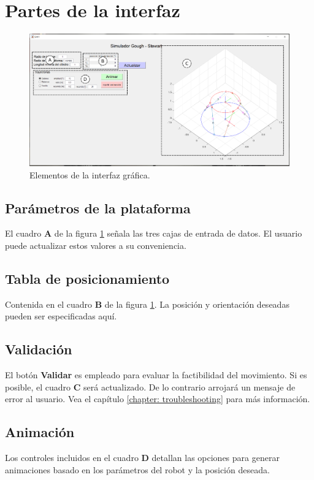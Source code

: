 \section{Partes de la interfaz}

\begin{figure}[ht]
 \centering
 \includegraphics[scale=0.3]{img/gui_labels.PNG}
 \caption{Elementos de la interfaz gráfica.}
 \label{fig: GUI explained}
\end{figure}

\subsection{Parámetros de la plataforma}
El cuadro \textbf{A} de la figura 
\ref{fig: GUI explained} señala las tres cajas de entrada
de datos. El usuario puede actualizar estos valores a su conveniencia.


\subsection{Tabla de posicionamiento}
Contenida en el cuadro \textbf{B} de la figura \ref{fig: GUI explained}.
La posición y orientación deseadas pueden ser especificadas aquí.


\subsection{Validación}
El botón \textbf{Validar} es empleado para evaluar la factibilidad del
movimiento. 
Si es posible, el cuadro \textbf{C} será actualizado. 
De lo contrario arrojará un mensaje de error al usuario. 
Vea el capítulo \ref{chapter: troubleshooting} para más información.

\subsection{Animación}
Los controles incluidos en el cuadro \textbf{D} detallan las
opciones para generar animaciones basado en los parámetros del robot
y la posición deseada.



